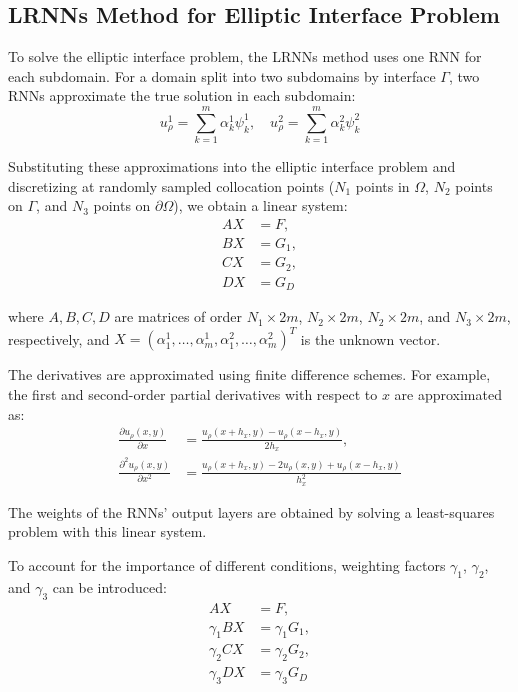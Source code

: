\documentclass[11pt]{article}
\begin{document}
\subsection{LRNNs Method for Elliptic Interface Problem}

To solve the elliptic interface problem, the LRNNs method uses one RNN for each subdomain. For a domain split into two subdomains by interface $\Gamma$, two RNNs approximate the true solution in each subdomain:
\begin{equation}
u_\rho^1 = \sum_{k=1}^{m} \alpha_k^1 \psi_k^1, \quad u_\rho^2 = \sum_{k=1}^{m} \alpha_k^2 \psi_k^2
\end{equation}

Substituting these approximations into the elliptic interface problem and discretizing at randomly sampled collocation points ($N_1$ points in $\Omega$, $N_2$ points on $\Gamma$, and $N_3$ points on $\partial\Omega$), we obtain a linear system:
\begin{align}
AX &= F, \\
BX &= G_1, \\
CX &= G_2, \\
DX &= G_D
\end{align}

where $A, B, C, D$ are matrices of order $N_1 \times 2m$, $N_2 \times 2m$, $N_2 \times 2m$, and $N_3 \times 2m$, respectively, and $X = (\alpha_1^1, \ldots, \alpha_m^1, \alpha_1^2, \ldots, \alpha_m^2)^T$ is the unknown vector.

The derivatives are approximated using finite difference schemes. For example, the first and second-order partial derivatives with respect to $x$ are approximated as:
\begin{align}
\frac{\partial u_\rho(x,y)}{\partial x} &= \frac{u_\rho(x+h_x,y) - u_\rho(x-h_x,y)}{2h_x}, \\
\frac{\partial^2 u_\rho(x,y)}{\partial x^2} &= \frac{u_\rho(x+h_x,y) - 2u_\rho(x,y) + u_\rho(x-h_x,y)}{h_x^2}
\end{align}

The weights of the RNNs' output layers are obtained by solving a least-squares problem with this linear system.

To account for the importance of different conditions, weighting factors $\gamma_1$, $\gamma_2$, and $\gamma_3$ can be introduced:
\begin{align}
AX &= F, \\
\gamma_1 BX &= \gamma_1 G_1, \\
\gamma_2 CX &= \gamma_2 G_2, \\
\gamma_3 DX &= \gamma_3 G_D
\end{align}
\end{document}
